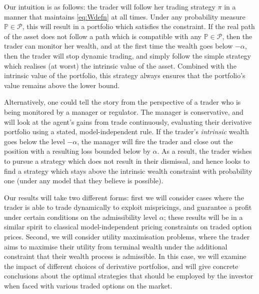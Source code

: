 \documentclass[a4paper]{amsart}
\theoremstyle{definition}
\theoremstyle{remark}
\numberwithin{equation}{section}
\renewcommand{\P}{\mathbb{P}}
\newcommand{\eps}{\varepsilon}
\newcommand{\Pc}{\mathcal{P}}
\begin{document}
Our intuition is as follows: the trader will follow her trading strategy $\pi$ in a manner that maintains \eqref{eq:Wdefn} at all times. Under any probability measure $\P \in \Pc$, this will result in a portfolio which satisfies the constraint. If the real path of the asset does not follow a path which is compatible with any $\P \in \Pc$, then the trader can monitor her wealth, and at the first time the wealth goes below $-\alpha$, then the trader will stop dynamic trading, and simply follow the simple strategy which realises (at worst) the intrinsic value of the asset. Combined with the intrinsic value of the portfolio, this strategy always ensures that the portfolio's value remains above the lower bound.%

Alternatively, one could tell the story from the perspective of a trader who is being monitored by a manager or regulator. The manager is conservative, and will look at the agent's gains from trade continuously, evaluating their derivative portfolio using a stated, model-independent rule. If the trader's \emph{intrinsic} wealth goes below the level $-\alpha$, the manager will fire the trader and close out the position with a resulting loss bounded below by $\alpha$. As a result, the trader wishes to pursue a strategy which does not result in their dismissal, and hence looks to find a strategy which stays above the intrinsic wealth constraint with probability one (under any model that they believe is possible).

Our results will take two different forms: first we will consider cases where the trader is able to trade dynamically to exploit mispricings, and guarantee a profit under certain conditions on the admissibility level $\alpha$; these results will be in a similar spirit to classical model-independent pricing constraints on traded option prices. Second, we will consider utility maximisation problems, where the trader aims to maximise their utility from terminal wealth under the additional constraint that their wealth process is admissible. In this case, we will examine the impact of different choices of derivative portfolios, and will give concrete conclusions about the optimal strategies that should be employed by the investor when faced with various traded options on the market.
\end{document}

